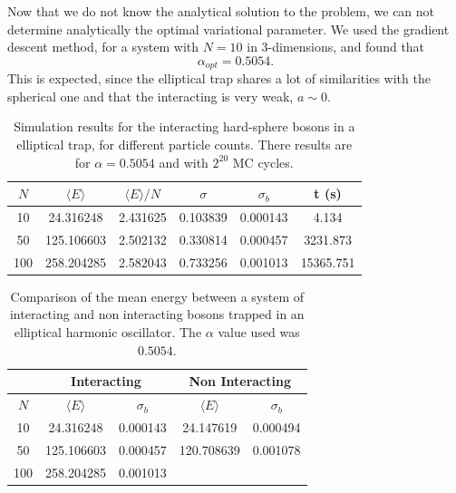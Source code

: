 \documentclass[aps,reprint,superscriptaddress,nofootinbib]{revtex4-2}
\begin{document}
    Now that we do not know the analytical solution to the problem, we can not determine analytically the optimal variational parameter. We used the gradient descent method, for a system with \(N=10\) in 3-dimensions, and found that
    \begin{equation*}
        \alpha_{opt} = 0.5054.
    \end{equation*}
    This is expected, since the elliptical trap shares a lot of similarities with the spherical one and that the interacting is very weak, \(a \sim 0\).
    
    \begingroup
    \setlength{\tabcolsep}{3pt} %
    \renewcommand{\arraystretch}{1.25} %
    \begin{table}[]
        \caption{Simulation results for the interacting hard-sphere bosons in a elliptical trap, for different particle counts. There results are for \(\alpha = 0.5054\) and with \(2^{20}\) MC cycles.}
        \begin{tabular}{c||ccccc}
        \(N\) & \(\langle E \rangle\) & \(\langle E \rangle / N\) & \(\sigma\) & \(\sigma_b\) & t (s) \\ \hline \hline
        10 & 24.316248 & 2.431625 & 0.103839 & 0.000143 & 4.134 \\
        50 & 125.106603 & 2.502132 & 0.330814 & 0.000457 & 3231.873 \\
        100 & 258.204285 & 2.582043 & 0.733256 & 0.001013 & 15365.751
        \end{tabular}
        \label{tab:E_int}
    \end{table}
    \endgroup
    
    \begingroup
    \setlength{\tabcolsep}{6pt} %
    \renewcommand{\arraystretch}{1.25} %
    \begin{table}[]
        \caption{Comparison of the mean energy between a system of interacting and non interacting bosons trapped in an elliptical harmonic oscillator. The \(\alpha\) value used was \(0.5054\).}
        \begin{tabular}{ccccc}
                                   & \multicolumn{2}{c}{Interacting}      & \multicolumn{2}{c}{Non Interacting}  \\ \hline \hline
        \multicolumn{1}{c||}{\(N\)} & \(\langle E \rangle\) & \(\sigma_b\) & \(\langle E \rangle\) & \(\sigma_b\) \\ \hline \hline
        \multicolumn{1}{c||}{10}  &    24.316248     &  0.000143   &      24.147619      &   0.000494   \\
        \multicolumn{1}{c||}{50}  &   125.106603         &   0.000457   &    120.708639       &    0.001078 \\
        \multicolumn{1}{c||}{100} &    258.204285        &  0.001013   &                       &             
        \end{tabular}
        \label{tab:comp_E_int}
    \end{table}
    \endgroup
    
\end{document}
